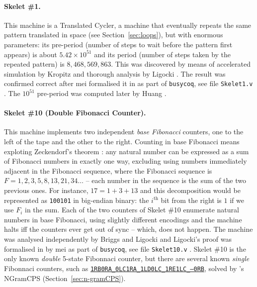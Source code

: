 \paragraph{Skelet \#1.} This machine is a Translated Cycler, \ie a machine that eventually repeats the same pattern translated in space (see Section~\ref{sec:loops}), but with enormous parameters: its pre-period (number of steps to wait before the pattern first appears) is about $5.42 \times 10^{51}$ and its period (number of steps taken by the repeated pattern) is $8,468,569,863$. This was discovered by means of accelerated simulation by Kropitz \cite{uniSk1} and thorough analysis by Ligocki \cite{ShawnSkelet1Before, ShawnSkelet1}. The result was confirmed correct after mei formalised it in \Coq as part of \texttt{busycoq}, see file \texttt{Skelet1.v} \cite{busycoq}. The $10^{51}$ pre-period was computed later by Huang \cite{hipparcosSk1}.



\paragraph{Skelet \#10 (Double Fibonacci Counter).} This machine implements two independent \textit{base Fibonacci} counters, one to the left of the tape and the other to the right. Counting in base Fibonacci means exploting Zeckendorf's theorem \cite{wiki:Zeckendorf's_theorem}: any natural number can be expressed as a sum of Fibonacci numbers in exactly one way, excluding using numbers immediately adjacent in the Fibonacci sequence, where the Fibonacci sequence is $F = 1,2,3,5,8,13,21,34\dots$ -- each number in the sequence is the sum of the two previous ones. For instance, $17 = 1 + 3 + 13$ and this decomposition would be represented as \texttt{100101} in big-endian binary: the $i^\text{th}$ bit from the right is $1$ if we use $F_i$ in the sum. Each of the two counters of Skelet \#10 enumerate natural numbers in base Fibonacci, using slightly different encodings and the machine halts iff the counters ever get out of sync -- which, does not happen. The machine was analysed independently by Briggs and Ligocki \cite{DanBriggs,ShawnSkelet10} and Ligocki's proof \cite{ShawnSkelet10} was formalised in \Coq by mei as part of \texttt{busycoq}, see file \texttt{Skelet10.v} \cite{busycoq}. Skelet \#10 is the only known \textit{double} 5-state Fibonnaci counter, but there are several known \textit{single} Fibonnaci counters, such as \href{https://bbchallenge.org/1RB0RA_0LC1RA_1LD0LC_1RE1LC_---0RB}{\texttt{1RB0RA\_0LC1RA\_1LD0LC\_1RE1LC\_---0RB}}, solved by \CoqBB's NGramCPS (Section~\ref{sec:n-gramCPS}).

